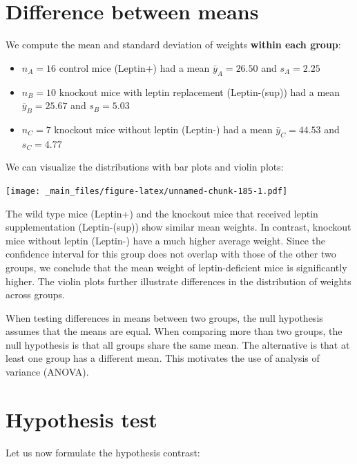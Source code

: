 \documentclass[
]{book}
\providecommand{\tightlist}{%
  \setlength{\itemsep}{0pt}\setlength{\parskip}{0pt}}
\begin{document}
\hypertarget{difference-between-means-2}{%
\section{Difference between means}\label{difference-between-means-2}}

We compute the mean and standard deviation of weights \textbf{within each group}:

\begin{itemize}
\tightlist
\item
  \(n_A = 16\) control mice (Leptin+) had a mean \(\bar{y}_A = 26.50\) and \(s_A = 2.25\)
\item
  \(n_B = 10\) knockout mice with leptin replacement (Leptin-(sup)) had a mean \(\bar{y}_B = 25.67\) and \(s_B = 5.03\)
\item
  \(n_C = 7\) knockout mice without leptin (Leptin-) had a mean \(\bar{y}_C = 44.53\) and \(s_C = 4.77\)
\end{itemize}

We can visualize the distributions with bar plots and violin plots:

\texttt{[image: \_main\_files/figure-latex/unnamed-chunk-185-1.pdf]}

The wild type mice (Leptin+) and the knockout mice that received leptin supplementation (Leptin-(sup)) show similar mean weights. In contrast, knockout mice without leptin (Leptin-) have a much higher average weight. Since the confidence interval for this group does not overlap with those of the other two groups, we conclude that the mean weight of leptin-deficient mice is significantly higher. The violin plots further illustrate differences in the distribution of weights across groups.

When testing differences in means between two groups, the null hypothesis assumes that the means are equal. When comparing more than two groups, the null hypothesis is that all groups share the same mean. The alternative is that at least one group has a different mean. This motivates the use of analysis of variance (ANOVA).

\hypertarget{hypothesis-test-2}{%
\section{Hypothesis test}\label{hypothesis-test-2}}

Let us now formulate the hypothesis contrast:
\end{document}
